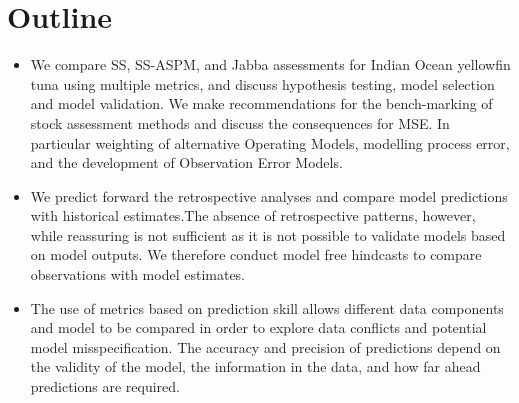 \documentclass[a4paper]{article}
\begin{document}
\maketitle
 
\section*{Outline}
\begin{itemize}
    
    
    
    \item  We   compare SS, SS-ASPM, and Jabba assessments for Indian Ocean yellowfin tuna  using multiple metrics, and discuss hypothesis testing, model selection and model validation. We make recommendations for the bench-marking of stock assessment methods and discuss the consequences for MSE. In particular weighting of alternative Operating Models, modelling process error, and the development of Observation Error Models.   

   \item We predict forward the retrospective analyses and compare model predictions with historical estimates.The absence of retrospective patterns, however, while reassuring is not sufficient as it is not possible to validate models based on model outputs. We therefore conduct model free hindcasts to compare observations with model estimates. 
   
   \item The use of metrics based on prediction skill allows different data components and model to be compared in order to explore data conflicts and potential model misspecification. The accuracy and precision of predictions depend on the validity of the model, the information in the data, and how far ahead predictions are required. 
    
\end{itemize}
\end{document}
